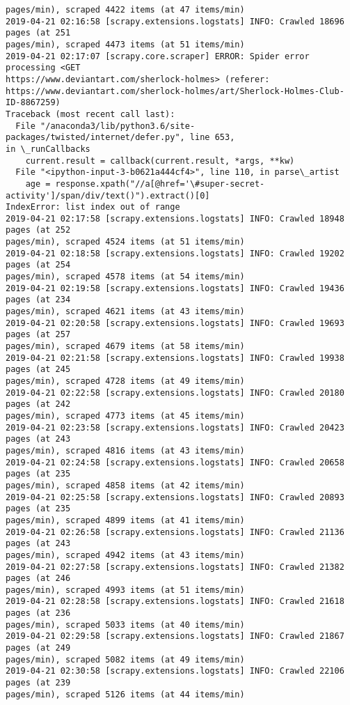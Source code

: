 \documentclass[11pt]{article}
\begin{document}
\begin{Verbatim}[commandchars=\\\{\},fontsize=\footnotesize]
pages/min), scraped 4422 items (at 47 items/min)
2019-04-21 02:16:58 [scrapy.extensions.logstats] INFO: Crawled 18696 pages (at 251
pages/min), scraped 4473 items (at 51 items/min)
2019-04-21 02:17:07 [scrapy.core.scraper] ERROR: Spider error processing <GET
https://www.deviantart.com/sherlock-holmes> (referer:
https://www.deviantart.com/sherlock-holmes/art/Sherlock-Holmes-Club-ID-8867259)
Traceback (most recent call last):
  File "/anaconda3/lib/python3.6/site-packages/twisted/internet/defer.py", line 653,
in \_runCallbacks
    current.result = callback(current.result, *args, **kw)
  File "<ipython-input-3-b0621a444cf4>", line 110, in parse\_artist
    age = response.xpath("//a[@href='\#super-secret-
activity']/span/div/text()").extract()[0]
IndexError: list index out of range
2019-04-21 02:17:58 [scrapy.extensions.logstats] INFO: Crawled 18948 pages (at 252
pages/min), scraped 4524 items (at 51 items/min)
2019-04-21 02:18:58 [scrapy.extensions.logstats] INFO: Crawled 19202 pages (at 254
pages/min), scraped 4578 items (at 54 items/min)
2019-04-21 02:19:58 [scrapy.extensions.logstats] INFO: Crawled 19436 pages (at 234
pages/min), scraped 4621 items (at 43 items/min)
2019-04-21 02:20:58 [scrapy.extensions.logstats] INFO: Crawled 19693 pages (at 257
pages/min), scraped 4679 items (at 58 items/min)
2019-04-21 02:21:58 [scrapy.extensions.logstats] INFO: Crawled 19938 pages (at 245
pages/min), scraped 4728 items (at 49 items/min)
2019-04-21 02:22:58 [scrapy.extensions.logstats] INFO: Crawled 20180 pages (at 242
pages/min), scraped 4773 items (at 45 items/min)
2019-04-21 02:23:58 [scrapy.extensions.logstats] INFO: Crawled 20423 pages (at 243
pages/min), scraped 4816 items (at 43 items/min)
2019-04-21 02:24:58 [scrapy.extensions.logstats] INFO: Crawled 20658 pages (at 235
pages/min), scraped 4858 items (at 42 items/min)
2019-04-21 02:25:58 [scrapy.extensions.logstats] INFO: Crawled 20893 pages (at 235
pages/min), scraped 4899 items (at 41 items/min)
2019-04-21 02:26:58 [scrapy.extensions.logstats] INFO: Crawled 21136 pages (at 243
pages/min), scraped 4942 items (at 43 items/min)
2019-04-21 02:27:58 [scrapy.extensions.logstats] INFO: Crawled 21382 pages (at 246
pages/min), scraped 4993 items (at 51 items/min)
2019-04-21 02:28:58 [scrapy.extensions.logstats] INFO: Crawled 21618 pages (at 236
pages/min), scraped 5033 items (at 40 items/min)
2019-04-21 02:29:58 [scrapy.extensions.logstats] INFO: Crawled 21867 pages (at 249
pages/min), scraped 5082 items (at 49 items/min)
2019-04-21 02:30:58 [scrapy.extensions.logstats] INFO: Crawled 22106 pages (at 239
pages/min), scraped 5126 items (at 44 items/min)

\end{Verbatim}
\end{document}
